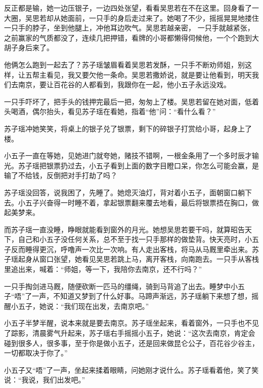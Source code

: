 反正都是输，她一边压银子，一边四处张望，看看吴思若在不在这里。回身看了一大圈，吴思若却从她面前，一只手的身后走过来了。她喝了不少，摇摇晃晃地搂住一只手的脖子，坐到他腿上，冲他耳边吹气。吴思若越亲密，
一只手就越紧张，之前赢家的气质都没了，连续几把押错，看牌的小哥都懒得伺候他，一个个跑到大胡子身后来了。

他俩怎么跑到一起去了？苏子瑶皱眉看着吴思若发酥，一只手不断劝师姐，别这样，让五帮主看见，我又要欠他一条命。吴思若撒娇说，就是要让他看到，明天我们去南京，要让百花谷的人都看到，我跟你在一起，他小五子永远没戏。

一只手吓坏了，把手头的钱押完最后一把，匆匆上了楼。吴思若留在她对面，低着头喝酒，偶尔抬头，看见苏子瑶在看她，指着“他”问：“看什么看？”

苏子瑶冲她笑笑，将桌上的银子兑了银票，剩下的碎银子打赏给小哥，起身上了楼。

小五子一直在等她，见她进门就夸她，赌技不错啊，一根金条用了一个多时辰才输光。苏子瑶把银票扔过去，小五子看到上面的数字目瞪口呆，你怎么可能会赢，是输了不给钱，反倒把对手打劫了吗？

苏子瑶没回答，说我困了，先睡了。她熄灭油灯，背对着小五子，面朝窗口躺下去。小五子兴奋得一时睡不着，拿起银票翻来覆去地看，最后将银票捂在胸口，做起美梦来。

而苏子瑶一直没睡，睁眼就能看到窗外的月光。她想吴思若要干吗，就算昭告天下，自己和小五子没任何关系，总不至于找一只手那样的做垫背。快天亮时，小五子反而睡得更沉，呼噜声一次比一次响。有人走出客栈，将马从马厩里牵出来。苏子瑶起身从窗口张望，她看见吴思若跳上马，离开客栈，向南跑去。一只手从客栈里追出来，喊着：“师姐，等一下，我陪你去南京，还不行吗？”

一只手掏剑进马厩，随便砍断一匹马的缰绳，骑到马背追了出去。睡梦中小五子“唔”了一声，不知道又梦到了什么好事。马蹄声渐远，苏子瑶躺下来想了想，摇醒小五子，她说：“我们现在出发，去南京吧。”

小五子半梦半醒，说本来就是要去南京。苏子瑶坐起来，看着窗外，一只手也不见了踪影，清晨雾气升起来，苏子瑶右手摇摇小五子，她说：“这次去南京，肯定会碰到很多人，很多事，至于你是做小五子，还是回来做昆仑公子，百花谷少谷主，一切都取决于你了。”

小五子又“唔”了一声，坐起来揉着眼睛，问她刚才说什么。苏子瑶看着他，笑了笑说：“我说，我们出发吧。”

\newpage